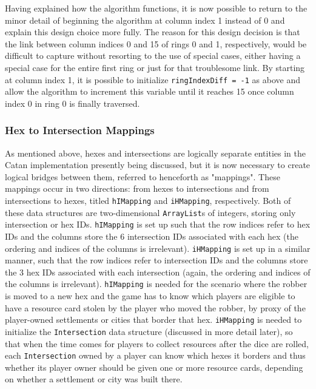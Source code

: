 \documentclass[pageno]{jpaper}
\begin{document}
\begin{doublespacing}
Having explained how the algorithm functions, it is now possible to return to the minor detail of beginning the algorithm at column index 1 instead of 0 and explain this design choice more fully. The reason for this design decision is that the link between column indices 0 and 15 of rings 0 and 1, respectively, would be difficult to capture without resorting to the use of special cases, either having a special case for the entire first ring or just for that troublesome link. By starting at column index 1, it is possible to initialize \lstinline$ringIndexDiff = -1$ as above and allow the algorithm to increment this variable until it reaches 15 once column index 0 in ring 0 is finally traversed.

\hypertarget{sec:hex_to_intersection_mappings}{}
\subsubsection{Hex to Intersection Mappings}

As mentioned above, hexes and intersections are logically separate entities in the Catan implementation presently being discussed, but it is now necessary to create logical bridges between them, referred to henceforth as "mappings". These mappings occur in two directions: from hexes to intersections and from intersections to hexes, titled \lstinline$hIMapping$ and \lstinline$iHMapping$, respectively. Both of these data structures are two-dimensional \lstinline$ArrayList$s of integers, storing only intersection or hex IDs. \lstinline$hIMapping$ is set up such that the row indices refer to hex IDs and the columns store the 6 intersection IDs associated with each hex (the ordering and indices of the columns is irrelevant). \lstinline$iHMapping$ is set up in a similar manner, such that the row indices refer to intersection IDs and the columns store the 3 hex IDs associated with each intersection (again, the ordering and indices of the columns is irrelevant). \lstinline$hIMapping$ is needed for the scenario where the robber is moved to a new hex and the game has to know which players are eligible to have a resource card stolen by the player who moved the robber, by proxy of the player-owned settlements or cities that border that hex. \lstinline$iHMapping$ is needed to initialize the \lstinline$Intersection$ data structure (discussed in more detail later), so that when the time comes for players to collect resources after the dice are rolled, each \lstinline$Intersection$ owned by a player can know which hexes it borders and thus whether its player owner should be given one or more resource cards, depending on whether a settlement or city was built there.


\end{doublespacing}
\end{document}
